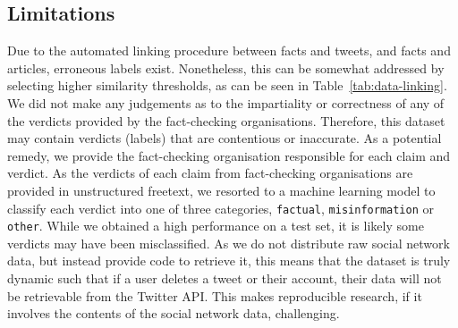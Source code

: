 \documentclass[sigconf,natbib=true,anonymous=false,nonacm]{acmart}
\begin{document}
\subsection{Limitations}
\label{sec:limitations}
Due to the automated linking procedure between facts and tweets, and facts and
articles, erroneous labels exist. Nonetheless, this can be somewhat addressed
by selecting higher similarity thresholds, as can be seen in
Table~\ref{tab:data-linking}. We did not make any judgements as to the
impartiality or correctness of any of the verdicts provided by the
fact-checking organisations. Therefore, this dataset may contain verdicts
(labels) that are contentious or inaccurate. As a potential remedy, we provide
the fact-checking organisation responsible for each claim and verdict. As the
verdicts of each claim from fact-checking organisations are provided in
unstructured freetext, we resorted to a machine learning model to classify each
verdict into one of three categories, \texttt{factual}, \texttt{misinformation}
or \texttt{other}. While we obtained a high performance on a test set, it is
likely some verdicts may have been misclassified. As we do not distribute raw
social network data, but instead provide code to retrieve it, this means that
the dataset is truly dynamic such that if a user deletes a tweet or their
account, their data will not be retrievable from the Twitter API. This makes
reproducible research, if it involves the contents of the social network data,
challenging.
\end{document}
